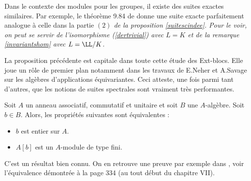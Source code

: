 \begin{Rem} Dans le contexte des modules pour les groupes, il existe des suites exactes similaires. Par exemple, le théorème 9.84 de \cite{Rotman} donne une suite exacte parfaitement analogue à celle dans la partie \em{$(2)$} \em de la proposition \ref{suitescindee}. Pour le voir, on peut se servir de l'isomorphisme (\ref{dertrivial}) avec $L = K$ et de la remarque \ref{invariantshom} avec $L = \LL/K$.
\end{Rem}

La proposition précédente est capitale dans toute cette étude des Ext-blocs. Elle joue un rôle de premier plan notamment dans les travaux de E.Neher et A.Savage sur les algèbres d'applications équivariantes. Ceci atteste, une fois parmi tant d'autres, que les notions de suites spectrales sont vraiment très performantes. 

\begin{Lem} \label{entiertypefini} Soit $A$ un anneau associatif, commutatif et unitaire et soit $B$ une $A$-algèbre. Soit $b \in B$. Alors, les propriétés suivantes sont équivalentes :
\begin{itemize}
\item[\em(i)] $b$ est entier sur $A$.
\item[\em(ii)] $A[b]$ est un $A$-module de type fini.
\end{itemize}
\end{Lem}

C'est un résultat bien connu. On en retrouve une preuve par exemple dans \cite{Lang}, voir l'équivalence démontrée à la page 334 (au tout début du chapitre VII).

